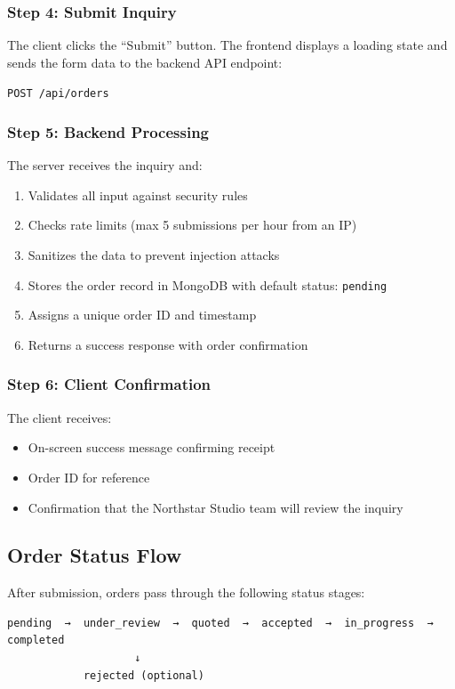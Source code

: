 \documentclass[12pt]{article}
\begin{document}
\subsubsection{Step 4: Submit Inquiry}
The client clicks the ``Submit'' button. The frontend displays a loading state and sends the form data to the backend API endpoint:

\texttt{POST /api/orders}

\subsubsection{Step 5: Backend Processing}
The server receives the inquiry and:
\begin{enumerate}
  \item Validates all input against security rules
  \item Checks rate limits (max 5 submissions per hour from an IP)
  \item Sanitizes the data to prevent injection attacks
  \item Stores the order record in MongoDB with default status: \texttt{pending}
  \item Assigns a unique order ID and timestamp
  \item Returns a success response with order confirmation
\end{enumerate}

\subsubsection{Step 6: Client Confirmation}
The client receives:
\begin{itemize}
  \item On-screen success message confirming receipt
  \item Order ID for reference
  \item Confirmation that the Northstar Studio team will review the inquiry
\end{itemize}

\subsection{Order Status Flow}

After submission, orders pass through the following status stages:

\begin{lstlisting}
pending  →  under_review  →  quoted  →  accepted  →  in_progress  →  completed
                    ↓
            rejected (optional)
\end{lstlisting}
\end{document}
